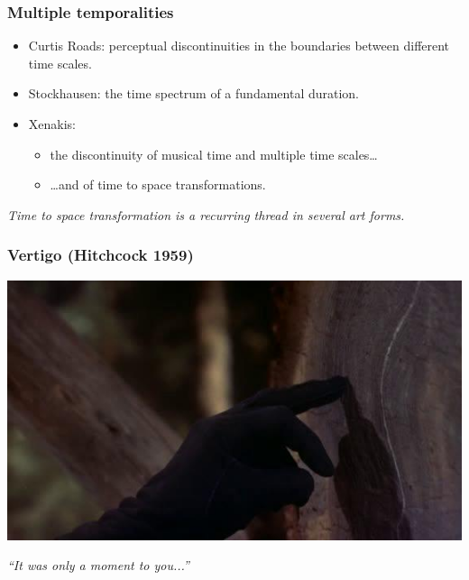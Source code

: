 \documentclass{beamer}
\begin{document}
\begin{frame}
  \frametitle{Multiple temporalities}
  \pause[2]
  \begin{block}{}
    \begin{itemize}
    \item<2-> Curtis Roads: perceptual discontinuities in the boundaries between different time scales.
    \item<3-> Stockhausen: the time spectrum of a fundamental duration.
    \item<3-> Xenakis:
      \begin{itemize}\item<4-> the discontinuity of musical time and multiple time scales\ldots
      \item<5-> \ldots and of time to space transformations.
      \end{itemize}
    \end{itemize}
  \end{block}
  \pause[6]
  \begin{block}{}
    \emph{Time to space transformation is a recurring thread in several art forms.}
  \end{block}
\end{frame}

\begin{frame}
  \frametitle{Vertigo (Hitchcock 1959)}
  \begin{center}
    \href{run:media/vertigo-test.avi}{\includegraphics[width=.8\textwidth]{media/vertigo-finger.jpg}}
  \end{center}
  \begin{center}
    \emph{``It was only a moment to you...''}
  \end{center}
\end{frame}
\end{document}
